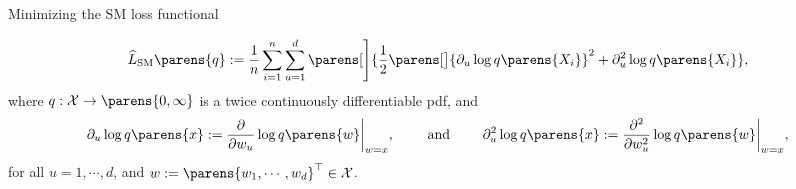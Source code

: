 \documentclass[aspectratio=169,xcolor=dvipsnames]{beamer}
\DeclareMathOperator*{\minimize}{minimize}
\DeclareMathOperator*{\maximize}{maximize}
\newcommand{\NLL}{\mathrm{NLL}}
\newcommand{\SM}{\mathrm{SM}}
\begin{document}
%	
%	
%	
%	


\begin{frame}{Minimizing the SM loss functional}
	
	\begin{align}
		\widehat{L}_{\SM} \parens{q} := \frac{1}{n} \sum_{i=1}^n \sum_{u=1}^d \parens[\Bigg]{\frac{1}{2} \parens[\big]{\partial_u \log q \parens{X_i}}^2 + \partial_u^2 \log q \parens{X_i}}, 
	\end{align}
	where $q: \mathcal{X} \to \parens{0, \infty}$ is a twice continuously differentiable pdf, and 
	\begin{align*}
		\partial_u \log q \parens{x} := \frac{\partial}{\partial w_u} \log q \parens{w} \bigg\vert_{w = x}, \qquad \text{ and } \qquad \partial_u^2 \log q \parens{x} := \frac{\partial^2}{\partial w_u^2} \log q \parens{w} \bigg\vert_{w = x}, 
	\end{align*}
	for all $u = 1, \cdots, d$, and $w := \parens{w_1, \cdots, w_d}^\top \in \mathcal{X}$. 
	
\end{frame}
\end{document}
